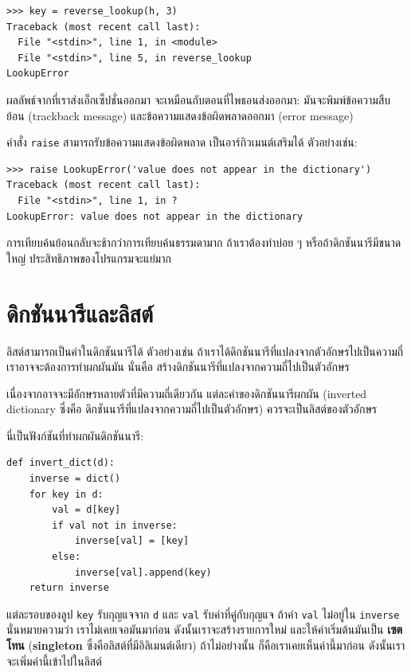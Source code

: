 \begin{verbatim}
>>> key = reverse_lookup(h, 3)
Traceback (most recent call last):
  File "<stdin>", line 1, in <module>
  File "<stdin>", line 5, in reverse_lookup
LookupError
\end{verbatim}
%
ผลลัพธ์จากที่เราส่งเอ็กเซ็ปชั่นออกมา จะเหมือนกับตอนที่ไพธอนส่งออกมา:
มันจะพิมพ์ข้อความสืบย้อน (trackback message) และข้อความแสดงข้อผิดพลาดออกมา (error message)

คำสั่ง \texttt{raise} สามารถรับข้อความแสดงข้อผิดพลาด เป็นอาร์กิวเมนต์เสริมได้
ตัวอย่างเช่น:

\begin{verbatim}
>>> raise LookupError('value does not appear in the dictionary')
Traceback (most recent call last):
  File "<stdin>", line 1, in ?
LookupError: value does not appear in the dictionary
\end{verbatim}
%
การเทียบค้นย้อนกลับจะช้ากว่าการเทียบค้นธรรมดามาก
ถ้าเราต้องทำบ่อย ๆ หรือถ้าดิกชันนารีมีขนาดใหญ่
ประสิทธิภาพของโปรแกรมจะแย่มาก

\section{ดิกชันนารีและลิสต์}
\label{invert}

ลิสต์สามารถเป็นค่าในดิกชันนารีได้
ตัวอย่างเช่น
ถ้าเราได้ดิกชันนารีที่แปลงจากตัวอักษรไปเป็นความถี่
เราอาจจะต้องการทำผกผันมัน นั่นคือ สร้างดิกชันนารีที่แปลงจากความถี่ไปเป็นตัวอักษร

เนื่องจากอาจจะมีอักษรหลายตัวที่มีความถี่เดียวกัน
แต่ละค่าของดิกชันนารีผกผัน (inverted dictionary ซึ่งคือ ดิกชันนารีที่แปลงจากความถี่ไปเป็นตัวอักษร)
ควรจะเป็นลิสต์ของตัวอักษร


นี่เป็นฟังก์ชันที่ทำผกผันดิกชันนารี:

\begin{verbatim}
def invert_dict(d):
    inverse = dict()
    for key in d:
        val = d[key]
        if val not in inverse:
            inverse[val] = [key]
        else:
            inverse[val].append(key)
    return inverse
\end{verbatim}
%
แต่ละรอบของลูป \texttt{key} รับกุญแจจาก \texttt{d} และ \texttt{val} รับค่าที่คู่กับกุญแจ
ถ้าค่า \texttt{val} ไม่อยู่ใน \texttt{inverse} นั่นหมายความว่า
เราไม่เคยเจอมันมาก่อน ดังนั้นเราจะสร้างรายการใหม่ และให้ค่าเริ่มต้นมันเป็น \textbf{เซตโทน} (\textbf{singleton} ซึ่งคือลิสต์ที่มีอิลิเมนต์เดียว)
ถ้าไม่อย่างนั้น ก็คือเราเคยเห็นค่านี้มาก่อน
ดังนั้นเราจะเพิ่มค่านี้เข้าไปในลิสต์  

